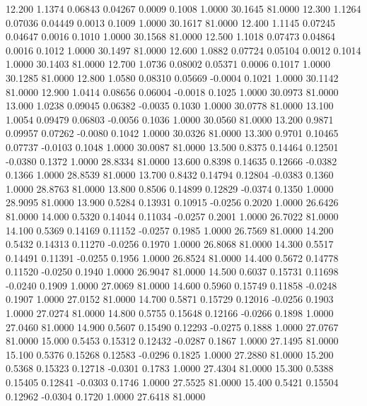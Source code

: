   12.200   1.1374   0.06843   0.04267   0.0009   0.1008   1.0000  30.1645  81.0000
  12.300   1.1264   0.07036   0.04449   0.0013   0.1009   1.0000  30.1617  81.0000
  12.400   1.1145   0.07245   0.04647   0.0016   0.1010   1.0000  30.1568  81.0000
  12.500   1.1018   0.07473   0.04864   0.0016   0.1012   1.0000  30.1497  81.0000
  12.600   1.0882   0.07724   0.05104   0.0012   0.1014   1.0000  30.1403  81.0000
  12.700   1.0736   0.08002   0.05371   0.0006   0.1017   1.0000  30.1285  81.0000
  12.800   1.0580   0.08310   0.05669  -0.0004   0.1021   1.0000  30.1142  81.0000
  12.900   1.0414   0.08656   0.06004  -0.0018   0.1025   1.0000  30.0973  81.0000
  13.000   1.0238   0.09045   0.06382  -0.0035   0.1030   1.0000  30.0778  81.0000
  13.100   1.0054   0.09479   0.06803  -0.0056   0.1036   1.0000  30.0560  81.0000
  13.200   0.9871   0.09957   0.07262  -0.0080   0.1042   1.0000  30.0326  81.0000
  13.300   0.9701   0.10465   0.07737  -0.0103   0.1048   1.0000  30.0087  81.0000
  13.500   0.8375   0.14464   0.12501  -0.0380   0.1372   1.0000  28.8334  81.0000
  13.600   0.8398   0.14635   0.12666  -0.0382   0.1366   1.0000  28.8539  81.0000
  13.700   0.8432   0.14794   0.12804  -0.0383   0.1360   1.0000  28.8763  81.0000
  13.800   0.8506   0.14899   0.12829  -0.0374   0.1350   1.0000  28.9095  81.0000
  13.900   0.5284   0.13931   0.10915  -0.0256   0.2020   1.0000  26.6426  81.0000
  14.000   0.5320   0.14044   0.11034  -0.0257   0.2001   1.0000  26.7022  81.0000
  14.100   0.5369   0.14169   0.11152  -0.0257   0.1985   1.0000  26.7569  81.0000
  14.200   0.5432   0.14313   0.11270  -0.0256   0.1970   1.0000  26.8068  81.0000
  14.300   0.5517   0.14491   0.11391  -0.0255   0.1956   1.0000  26.8524  81.0000
  14.400   0.5672   0.14778   0.11520  -0.0250   0.1940   1.0000  26.9047  81.0000
  14.500   0.6037   0.15731   0.11698  -0.0240   0.1909   1.0000  27.0069  81.0000
  14.600   0.5960   0.15749   0.11858  -0.0248   0.1907   1.0000  27.0152  81.0000
  14.700   0.5871   0.15729   0.12016  -0.0256   0.1903   1.0000  27.0274  81.0000
  14.800   0.5755   0.15648   0.12166  -0.0266   0.1898   1.0000  27.0460  81.0000
  14.900   0.5607   0.15490   0.12293  -0.0275   0.1888   1.0000  27.0767  81.0000
  15.000   0.5453   0.15312   0.12432  -0.0287   0.1867   1.0000  27.1495  81.0000
  15.100   0.5376   0.15268   0.12583  -0.0296   0.1825   1.0000  27.2880  81.0000
  15.200   0.5368   0.15323   0.12718  -0.0301   0.1783   1.0000  27.4304  81.0000
  15.300   0.5388   0.15405   0.12841  -0.0303   0.1746   1.0000  27.5525  81.0000
  15.400   0.5421   0.15504   0.12962  -0.0304   0.1720   1.0000  27.6418  81.0000
